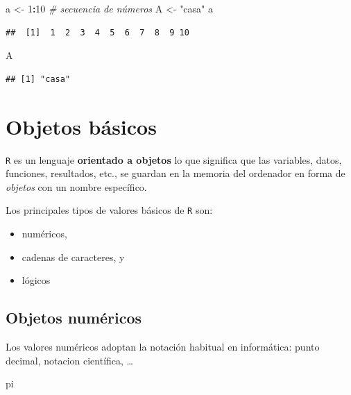 \documentclass[]{book}
\newenvironment{Shaded}{\begin{snugshade}}{\end{snugshade}}
\newcommand{\DecValTok}[1]{\textcolor[rgb]{0.00,0.00,0.81}{#1}}
\newcommand{\StringTok}[1]{\textcolor[rgb]{0.31,0.60,0.02}{#1}}
\newcommand{\CommentTok}[1]{\textcolor[rgb]{0.56,0.35,0.01}{\textit{#1}}}
\newcommand{\OperatorTok}[1]{\textcolor[rgb]{0.81,0.36,0.00}{\textbf{#1}}}
\newcommand{\NormalTok}[1]{#1}
\begin{document}
\begin{Shaded}
\begin{Highlighting}[]
\NormalTok{a <-}\StringTok{ }\DecValTok{1}\OperatorTok{:}\DecValTok{10} \CommentTok{# secuencia de números}
\NormalTok{A <-}\StringTok{ "casa"}
\NormalTok{a}
\end{Highlighting}
\end{Shaded}

\begin{verbatim}
##  [1]  1  2  3  4  5  6  7  8  9 10
\end{verbatim}

\begin{Shaded}
\begin{Highlighting}[]
\NormalTok{A}
\end{Highlighting}
\end{Shaded}

\begin{verbatim}
## [1] "casa"
\end{verbatim}

\section{Objetos básicos}\label{objetos-basicos}

\texttt{R} es un lenguaje \textbf{orientado a objetos} lo que significa
que las variables, datos, funciones, resultados, etc., se guardan en la
memoria del ordenador en forma de \emph{objetos} con un nombre
específico.

Los principales tipos de valores básicos de \texttt{R} son:

\begin{itemize}
\item
  numéricos,
\item
  cadenas de caracteres, y
\item
  lógicos
\end{itemize}

\subsection{Objetos numéricos}\label{objetos-numericos}

Los valores numéricos adoptan la notación habitual en informática: punto
decimal, notacion científica, \ldots{}

\begin{Shaded}
\begin{Highlighting}[]
\NormalTok{pi}
\end{Highlighting}
\end{Shaded}
\end{document}
